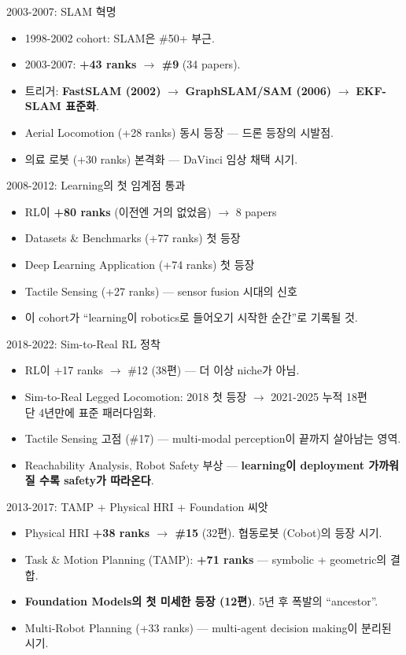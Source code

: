 \documentclass[aspectratio=169,t]{beamer}
\newcommand{\hot}[1]{\textcolor{accentorange}{\textbf{#1}}}
\newcommand{\cool}[1]{\textcolor{accentblue}{\textbf{#1}}}
\newcommand{\muted}[1]{\textcolor{mutedgray}{#1}}
\begin{document}
\begin{frame}{2003-2007: SLAM 혁명}
\begin{itemize}
  \item 1998-2002 cohort: SLAM은 \#50+ 부근.
  \item 2003-2007: \hot{+43 ranks $\to$ \#9} (34 papers).
  \item 트리거: \cool{FastSLAM (2002)} $\to$ \cool{GraphSLAM/SAM (2006)} $\to$ \cool{EKF-SLAM 표준화}.
  \item Aerial Locomotion (+28 ranks) 동시 등장 — 드론 등장의 시발점.
  \item 의료 로봇 (+30 ranks) 본격화 — DaVinci 임상 채택 시기.
\end{itemize}
\end{frame}

\begin{frame}{2008-2012: Learning의 첫 임계점 통과}
\begin{itemize}
  \item RL이 \hot{+80 ranks} (이전엔 거의 없었음) $\to$ 8 papers
  \item Datasets \& Benchmarks (+77 ranks) 첫 등장
  \item Deep Learning Application (+74 ranks) 첫 등장
  \item Tactile Sensing (+27 ranks) — sensor fusion 시대의 신호
  \item \muted{이 cohort가 ``learning이 robotics로 들어오기 시작한 순간''로 기록될 것.}
\end{itemize}
\end{frame}

\begin{frame}{2018-2022: Sim-to-Real RL 정착}
\begin{itemize}
  \item RL이 +17 ranks $\to$ \#12 (38편) — 더 이상 niche가 아님.
  \item Sim-to-Real Legged Locomotion: 2018 첫 등장 $\to$ 2021-2025 누적 18편 \\
        \muted{단 4년만에 표준 패러다임화.}
  \item Tactile Sensing 고점 (\#17) — multi-modal perception이 끝까지 살아남는 영역.
  \item Reachability Analysis, Robot Safety 부상 — \cool{learning이 deployment 가까워질 수록 safety가 따라온다}.
\end{itemize}
\end{frame}

\begin{frame}{2013-2017: TAMP + Physical HRI + Foundation 씨앗}
\begin{itemize}
  \item Physical HRI \hot{+38 ranks $\to$ \#15} (32편). 협동로봇 (Cobot)의 등장 시기.
  \item Task \& Motion Planning (TAMP): \hot{+71 ranks} — symbolic + geometric의 결합.
  \item \cool{Foundation Models의 첫 미세한 등장 (12편)}. 5년 후 폭발의 ``ancestor''.
  \item Multi-Robot Planning (+33 ranks) — multi-agent decision making이 분리된 시기.
\end{itemize}
\end{frame}
\end{document}
